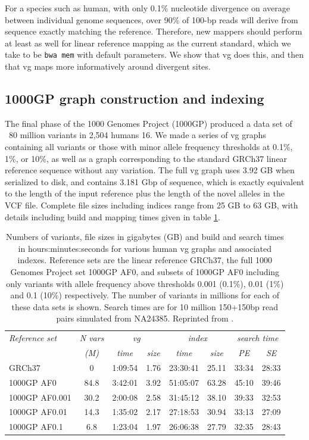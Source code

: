 For a species such as human, with only 0.1\% nucleotide divergence on average between individual genome sequences, over 90\% of 100-bp reads will derive from sequence exactly matching the reference.
Therefore, new mappers should perform at least as well for linear reference mapping as the current standard, which we take to be {\tt bwa mem} with default parameters.
We show that vg does this, and then that vg maps more informatively around divergent sites.

\subsection{1000GP graph construction and indexing}

The final phase of the 1000 Genomes Project (1000GP) produced a data set of ~80 million variants in 2,504 humans 16.
We made a series of vg graphs containing all variants or those with minor allele frequency thresholds at 0.1\%, 1\%, or 10\%, as well as a graph corresponding to the standard GRCh37 linear reference sequence without any variation.
The full vg graph uses 3.92 GB when serialized to disk, and contains 3.181 Gbp of sequence, which is exactly equivalent to the length of the input reference plus the length of the novel alleles in the VCF file.
Complete file sizes including indices range from 25 GB to 63 GB, with details including build and mapping times given in table \ref{table:1000GP}.

\begin{table}[h]
\begin{tabular}{l||c|cc|cc|cc}
\itshape Reference set & \itshape N vars & \multicolumn{2}{c}{\itshape vg} & \multicolumn{2}{c}{\itshape index} & \multicolumn{2}{c}{\itshape search time}\\
& \itshape (M) & \itshape time & \itshape size & \itshape time & \itshape size & \itshape  PE & \itshape SE\\
\hline
GRCh37 & 0 & 1:09:54 & 1.76 & 23:30:41 & 25.11 & 33:34 & 28:33 \\
1000GP AF0 & 84.8 & 3:42:01 & 3.92 & 51:05:07 & 63.28 & 45:10 & 39:46 \\
1000GP AF0.001 & 30.2 & 2:00:08 & 2.58 & 31:45:12 & 38.10 & 39:33 & 32:53 \\
1000GP AF0.01 & 14.3 & 1:35:02 & 2.17 & 27:18:53 & 30.94 & 33:13 & 27:09\\
1000GP AF0.1 & 6.8 & 1:23:04 & 1.97 & 26:06:38 & 27.79 & 32:35 & 28:43 \\
\hline
\end{tabular}
\caption[1000GP variation graphs]{Numbers of variants, file sizes in gigabytes (GB) and build and search times in hours:minutes:seconds for various human vg graphs and associated indexes. Reference sets are the linear reference GRCh37, the full 1000 Genomes Project set 1000GP AF0, and subsets of 1000GP AF0 including only variants with allele frequency above thresholds 0.001 (0.1\%), 0.01 (1\%) and 0.1 (10\%) respectively.  The number of variants in millions for each of these data sets is shown.  Search times are for 10 million 150+150bp read pairs simulated from NA24385.
    Reprinted from \cite{garrison2018variation}.
}
\label{table:1000GP}
\end{table}

